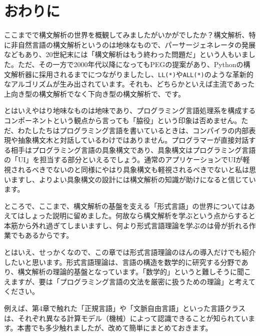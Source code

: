 \hypertarget{chapter8-ux304aux308fux308aux306b}{%
\chapter{おわりに}\label{chapter8-ux304aux308fux308aux306b}}

ここまでで構文解析の世界を概観してみましたがいかがでしたか？構文解析、特に非自然言語の構文解析というのは地味なもので、パーサージェネレータの発展などもあり、20世紀末には「構文解析はもう終わった問題だ」という人もいました。ただ、その一方で2000年代以降になってもPEGの提案があり、Pythonの構文解析器に採用されるまでにつながりましたし、\texttt{LL(*)}や\texttt{ALL(*)}のような革新的なアルゴリズムが生み出されています。それも、どちらかといえば主流であった上向き型の構文解析でなく下向き型の構文解析で、です。

とはいえやはり地味なものは地味であり、プログラミング言語処理系を構成するコンポーネントという観点から言っても「脇役」という印象は否めません。ただ、わたしたちはプログラミング言語を書いているときは、コンパイラの内部表現や抽象構文木と対話しているわけではありません。プログラマーが直接対話する相手はプログラミング言語の具象構文であり、具象構文はプログラミング言語の「UI」を担当する部分といえるでしょう。通常のアプリケーションでUIが軽視されるべきでないのと同様にやはり具象構文も軽視されるべきでないと私は思いますし、よりよい具象構文の設計には構文解析の知識が助けになると信じています。

ところで、ここまで、構文解析の基盤を支える「形式言語」の世界についてはあえてはしょった説明に留めました。何故なら構文解析を学ぶという点からすると本筋から外れ過ぎてしまいますし、何より形式言語理論を学ぶのは骨が折れる作業でもあるからです。

とはいえ、せっかくなので、この章では形式言語理論のほんの導入だけでも紹介したいと思います。形式言語理論は、言語の構造を数学的に研究する分野であり、構文解析の理論的基盤となっています。「数学的」というと難しそうに聞こえますが、要は「プログラミング言語の文法を厳密に扱うための理論」と考えてください。

例えば、第4章で触れた「正規言語」や「文脈自由言語」といった言語クラスは、それぞれ異なる計算モデル（機械）によって認識できることが知られています。本書でも多少触れましたが、改めて簡単にまとめておきます。

